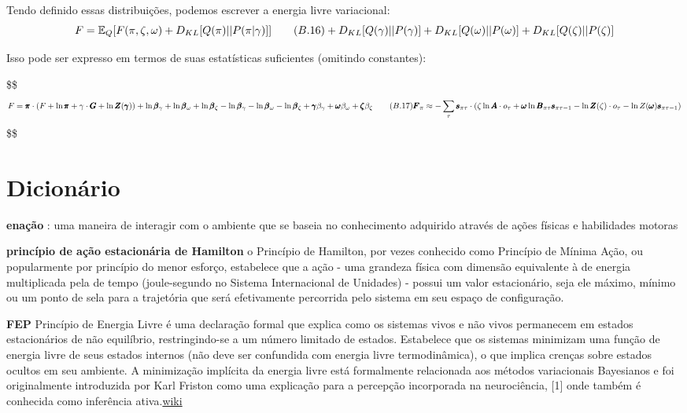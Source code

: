 \documentclass[
  12pt,
]{book}
\begin{document}
Tendo definido essas distribuições, podemos escrever a energia livre variacional:
\[
\begin{equation}
F = \mathbb E_Q[F(\pi, \zeta, \omega) + D_{KL}[Q(\pi) || P(\pi | \gamma)]] \qquad (B.16) \\ 
+ D_{KL}[Q(\gamma) || P(\gamma)] + D_{KL}[Q(\omega)||P(\omega)]+D_{KL}[Q(\zeta) || P(\zeta)] 
\end{equation}
\]

Isso pode ser expresso em termos de suas estatísticas suficientes (omitindo constantes):

\$\$\begin{equation}

F = \pmb \pi \cdot (F+ \ln \pmb \pi + \gamma \cdot \pmb G + \ln \pmb Z(\pmb \gamma)) + \ln \pmb \beta_\gamma + \ln \pmb \beta_\omega + \ln \pmb \beta_\zeta \\
- \ln \pmb \beta_\gamma - \ln \pmb \beta_\omega - \ln \pmb \beta_\zeta + \pmb \gamma \beta_\gamma + \pmb \omega \beta_\omega + \pmb \zeta \beta_\zeta \qquad (B.17) \\
\pmb F_\pi \approx - \sum_\tau \pmb s_{\pi\tau} \cdot(\zeta \ln \pmb A \cdot o_\tau + \pmb \omega \ln \pmb B_{\pi\tau}\pmb s_{\pi\tau -1} - \ln \pmb Z(\zeta) \cdot o_\tau - \ln Z(\pmb \omega)\pmb s_{\pi\tau-1})

\end{equation}\$\$

\cleardoublepage

\hypertarget{dicionuxe1rio}{%
\chapter*{Dicionário}\label{dicionuxe1rio}}

\textbf{enação} : uma maneira de interagir com o ambiente que se baseia no conhecimento adquirido através de ações físicas e habilidades motoras

\textbf{princípio de ação estacionária de Hamilton} o Princípio de Hamilton, por vezes conhecido como Princípio de Mínima Ação, ou popularmente por princípio do menor esforço, estabelece que a ação - uma grandeza física com dimensão equivalente à de energia multiplicada pela de tempo (joule-segundo no Sistema Internacional de Unidades) - possui um valor estacionário, seja ele máximo, mínimo ou um ponto de sela para a trajetória que será efetivamente percorrida pelo sistema em seu espaço de configuração.

\textbf{FEP} Princípio de Energia Livre é uma declaração formal que explica como os sistemas vivos e não vivos permanecem em estados estacionários de não equilíbrio, restringindo-se a um número limitado de estados. Estabelece que os sistemas minimizam uma função de energia livre de seus estados internos (não deve ser confundida com energia livre termodinâmica), o que implica crenças sobre estados ocultos em seu ambiente. A minimização implícita da energia livre está formalmente relacionada aos métodos variacionais Bayesianos e foi originalmente introduzida por Karl Friston como uma explicação para a percepção incorporada na neurociência, {[}1{]} onde também é conhecida como inferência ativa.\href{https://pt.wikipedia.org/wiki/Princ\%C3\%ADpio_da_energia_livre}{wiki}
\end{document}
